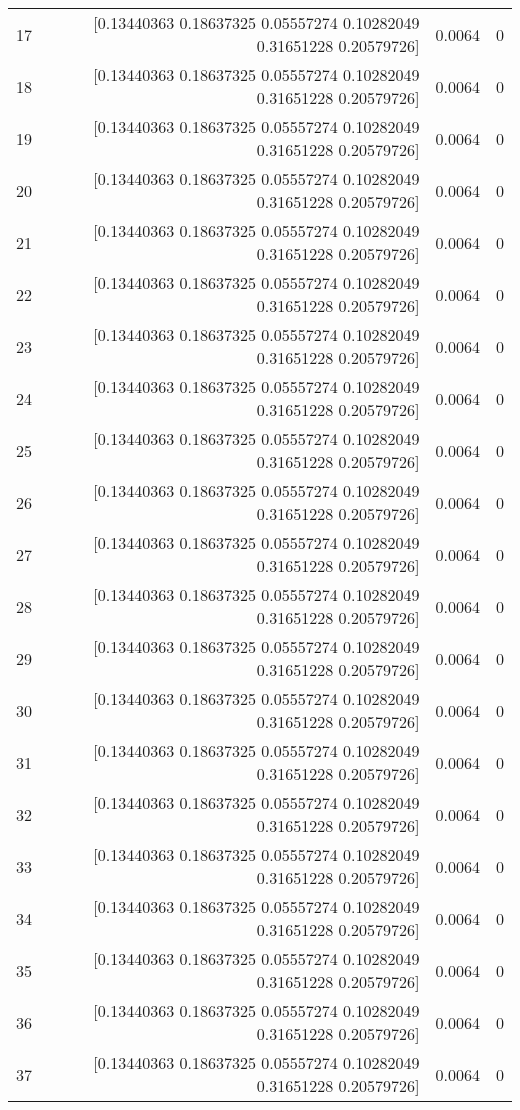 \begin{longtable}{lrrr}
17 & [0.13440363 0.18637325 0.05557274 0.10282049 0.31651228 0.20579726] & 0.0064 & 0 \\
18 & [0.13440363 0.18637325 0.05557274 0.10282049 0.31651228 0.20579726] & 0.0064 & 0 \\
19 & [0.13440363 0.18637325 0.05557274 0.10282049 0.31651228 0.20579726] & 0.0064 & 0 \\
20 & [0.13440363 0.18637325 0.05557274 0.10282049 0.31651228 0.20579726] & 0.0064 & 0 \\
21 & [0.13440363 0.18637325 0.05557274 0.10282049 0.31651228 0.20579726] & 0.0064 & 0 \\
22 & [0.13440363 0.18637325 0.05557274 0.10282049 0.31651228 0.20579726] & 0.0064 & 0 \\
23 & [0.13440363 0.18637325 0.05557274 0.10282049 0.31651228 0.20579726] & 0.0064 & 0 \\
24 & [0.13440363 0.18637325 0.05557274 0.10282049 0.31651228 0.20579726] & 0.0064 & 0 \\
25 & [0.13440363 0.18637325 0.05557274 0.10282049 0.31651228 0.20579726] & 0.0064 & 0 \\
26 & [0.13440363 0.18637325 0.05557274 0.10282049 0.31651228 0.20579726] & 0.0064 & 0 \\
27 & [0.13440363 0.18637325 0.05557274 0.10282049 0.31651228 0.20579726] & 0.0064 & 0 \\
28 & [0.13440363 0.18637325 0.05557274 0.10282049 0.31651228 0.20579726] & 0.0064 & 0 \\
29 & [0.13440363 0.18637325 0.05557274 0.10282049 0.31651228 0.20579726] & 0.0064 & 0 \\
30 & [0.13440363 0.18637325 0.05557274 0.10282049 0.31651228 0.20579726] & 0.0064 & 0 \\
31 & [0.13440363 0.18637325 0.05557274 0.10282049 0.31651228 0.20579726] & 0.0064 & 0 \\
32 & [0.13440363 0.18637325 0.05557274 0.10282049 0.31651228 0.20579726] & 0.0064 & 0 \\
33 & [0.13440363 0.18637325 0.05557274 0.10282049 0.31651228 0.20579726] & 0.0064 & 0 \\
34 & [0.13440363 0.18637325 0.05557274 0.10282049 0.31651228 0.20579726] & 0.0064 & 0 \\
35 & [0.13440363 0.18637325 0.05557274 0.10282049 0.31651228 0.20579726] & 0.0064 & 0 \\
36 & [0.13440363 0.18637325 0.05557274 0.10282049 0.31651228 0.20579726] & 0.0064 & 0 \\
37 & [0.13440363 0.18637325 0.05557274 0.10282049 0.31651228 0.20579726] & 0.0064 & 0 \\

\end{longtable}
